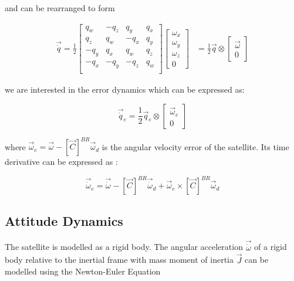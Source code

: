 and can be rearranged to form

\begin{align}
    \vec{\dot{q}}
=\frac{1}{2}
\begin{bmatrix}
q_{w} & -q_{z} & q_{y} & q_{x} \\ 
q_{z} & q_{w} & -q_{x} & q_{y} \\ 
-q_{y} & q_{x} & q_{w} & q_{z} \\ 
-q_{x} & -q_{y} & -q_{z} & q_{w} \\
\end{bmatrix} \begin{bmatrix}\omega_x \\ \omega_y \\ \omega_z \\ 0 \end{bmatrix}
&= \frac{1}{2} \vec{q} \otimes \begin{bmatrix}\vec{\omega} \\ 0 \end{bmatrix}
\end{align}

we are interested in the error dynamics which can be expressed as:

\begin{equation} \label{eq:q_error_kinematics}
    \vec{\dot{q}}_e = \frac{1}{2} \vec{q}_e \otimes \begin{bmatrix}\vec{\omega}_e \\ 0 \end{bmatrix}
\end{equation}

where $\vec{\omega}_e = \vec{\omega} - [\vec{C}]^{BR}\vec{\omega}_d$ is the angular velocity error of the satellite. Its time derivative can be expressed as \cite{nadafiRobustBacksteppingAttitude2021}: 

\begin{equation} \label{eq:omega_error}
    \vec{\dot{\omega}}_e = \vec{\dot{\omega}} - [\vec{C}]^{BR}\vec{\dot{\omega}}_d + \vec{\omega}_e \times [\vec{C}]^{BR}\vec{\omega}_d
\end{equation}


\subsection{Attitude Dynamics}

The satellite is modelled as a rigid body. The angular acceleration $\vec{\dot{\omega}}$ of a rigid body relative to the inertial frame with mass moment of inertia $\vec{J}$ can be modelled using the Newton-Euler Equation 

